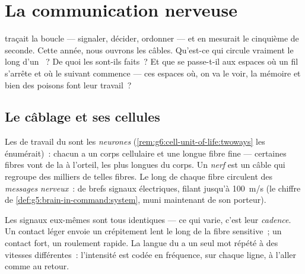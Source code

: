 \chapter{La communication nerveuse}\label{ch:g8:nervous-communication}

 traçait la boucle --- signaler,
décider, ordonner --- et en mesurait le cinquième de seconde. Cette
année, nous ouvrons les câbles. Qu'est-ce qui circule vraiment le
long d'un ~? De quoi les  sont-ils faits~? Et que se
passe-t-il aux espaces où un fil s'arrête et où le suivant commence
--- ces espaces où, on va le voir, la mémoire et bien des poisons
font leur travail~?

\section{Le câblage et ses cellules}

\begin{definition}\label{def:g8:nervous-communication:neuron}
Les  de travail du  sont les
\emph{neurones}
(\cref{rem:g6:cell-unit-of-life:twoways} les énumérait)~: chacun a un
corps cellulaire et une longue fibre fine --- certaines fibres vont
de la  à l'orteil, les plus longues  du
corps. Un \emph{nerf} est un câble qui regroupe des
milliers de telles fibres. Le long de chaque fibre circulent des
\emph{messages nerveux}~: de brefs signaux
électriques, filant jusqu'à \qty{100}{m/s}
(le chiffre de \cref{def:g5:brain-in-command:system}, muni
maintenant de son porteur).
\end{definition}

\begin{proposition}\label{prop:g8:nervous-communication:code}
Les signaux eux-mêmes sont tous identiques --- ce qui varie, c'est
leur \emph{cadence}. Un contact léger envoie un crépitement lent le
long de la fibre sensitive~; un contact fort, un roulement rapide.
La langue du  a un seul mot répété à des vitesses
différentes~: l'intensité est codée en fréquence, sur chaque ligne,
à l'aller comme au retour.
\end{proposition}
\admitted

